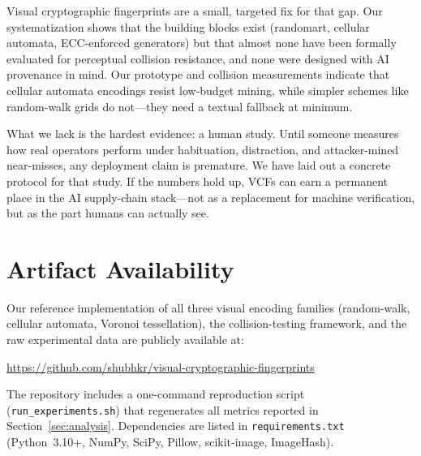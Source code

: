 \documentclass[conference,10pt]{IEEEtran}
\begin{document}
Visual cryptographic fingerprints are a small, targeted fix for that gap.
Our systematization shows that the building blocks exist (randomart, cellular automata, ECC-enforced generators) but that almost none have been formally evaluated for perceptual collision resistance, and none were designed with AI provenance in mind.
Our prototype and collision measurements indicate that cellular automata encodings resist low-budget mining, while simpler schemes like random-walk grids do not---they need a textual fallback at minimum.

What we lack is the hardest evidence: a human study.
Until someone measures how real operators perform under habituation, distraction, and attacker-mined near-misses, any deployment claim is premature.
We have laid out a concrete protocol for that study.
If the numbers hold up, VCFs can earn a permanent place in the AI supply-chain stack---not as a replacement for machine verification, but as the part humans can actually see.

\section*{Artifact Availability}
Our reference implementation of all three visual encoding families (random-walk, cellular automata, Voronoi tessellation), the collision-testing framework, and the raw experimental data are publicly available at:
\begin{center}
\url{https://github.com/shubhkr/visual-cryptographic-fingerprints}
\end{center}
The repository includes a one-command reproduction script (\texttt{run\_experiments.sh}) that regenerates all metrics reported in Section~\ref{sec:analysis}. Dependencies are listed in \texttt{requirements.txt} (Python~3.10+, NumPy, SciPy, Pillow, scikit-image, ImageHash).

\balance


\end{document}
